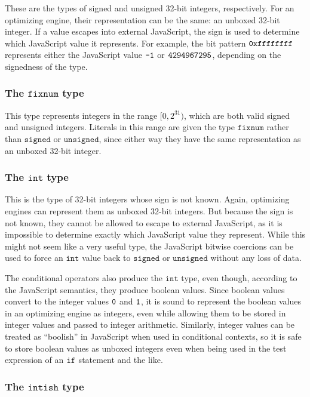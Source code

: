 \documentclass{article}
\newcommand{\mathjs}[1]{\mbox{\texttt{{#1}}}}
\newcommand{\unsigned}{\mathtt{unsigned}}
\newcommand{\signed}{\mathtt{signed}}
\newcommand{\fixnum}{\mathtt{fixnum}}
\renewcommand{\int}{\mathtt{int}}
\newcommand{\intish}{\mathtt{intish}}
\begin{document}
These are the types of signed and unsigned 32-bit integers,
respectively. For an optimizing engine, their representation can be
the same: an unboxed 32-bit integer. If a value escapes into external
JavaScript, the sign is used to determine which JavaScript value it
represents. For example, the bit pattern $\mathjs{0xffffffff}$
represents either the JavaScript value $\mathjs{-1}$ or
$\mathjs{4294967295}$, depending on the signedness of the type.

\subsubsection*{The $\fixnum$ type}

This type represents integers in the range $[0, 2^{31})$, which are
both valid signed and unsigned integers. Literals in this range are
given the type $\fixnum$ rather than $\signed$ or $\unsigned$, since
either way they have the same representation as an unboxed 32-bit
integer.

\subsubsection*{The $\int$ type}

This is the type of 32-bit integers whose sign is not known. Again,
optimizing engines can represent them as unboxed 32-bit integers. But
because the sign is not known, they cannot be allowed to escape to
external JavaScript, as it is impossible to determine exactly which
JavaScript value they represent. While this might not seem like a very
useful type, the JavaScript bitwise coercions can be used to force an
$\int$ value back to $\signed$ or $\unsigned$ without any loss of
data.

The conditional operators also produce the $\int$ type, even though,
according to the JavaScript semantics, they produce boolean
values. Since boolean values convert to the integer values
$\mathjs{0}$ and $\mathjs{1}$, it is sound to represent the boolean
values in an optimizing engine as integers, even while allowing them
to be stored in integer values and passed to integer
arithmetic. Similarly, integer values can be treated as ``boolish'' in
JavaScript when used in conditional contexts, so it is safe to store
boolean values as unboxed integers even when being used in the test
expression of an $\mathjs{if}$ statement and the like.

\subsubsection*{The $\intish$ type}
\end{document}
